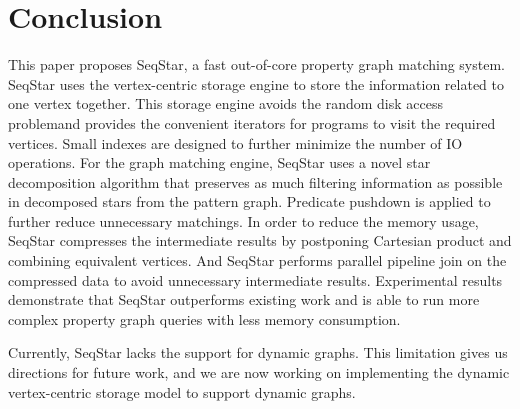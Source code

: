 \section{Conclusion}\label{sec:conclusion}
This paper proposes SeqStar, a fast out-of-core property graph matching system.
SeqStar uses the vertex-centric storage engine to store the information related to one vertex together.
This storage engine avoids the random disk access problemand provides the convenient iterators for programs to visit the required vertices.
Small indexes are designed to further minimize the number of IO operations.
For the graph matching engine,
SeqStar uses a novel star decomposition algorithm that preserves as much filtering information as possible in decomposed stars from the pattern graph.
Predicate pushdown is applied to further reduce unnecessary matchings.
In order to reduce the memory usage, SeqStar compresses the intermediate results by postponing Cartesian product and combining equivalent vertices.
And SeqStar performs parallel pipeline join on the compressed data to avoid unnecessary intermediate results.
Experimental results demonstrate that SeqStar outperforms existing work and is able to run more complex property graph queries with less memory consumption.


Currently, SeqStar lacks the support for dynamic graphs.
This limitation gives us directions for future work,
and we are now working on implementing the dynamic vertex-centric storage model to support dynamic graphs.
